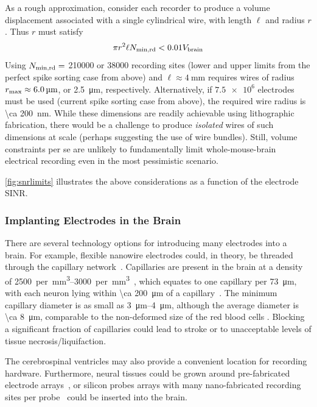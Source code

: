 As a rough approximation, consider each recorder to produce a volume displacement associated with a single cylindrical wire, with length $\ell$ and radius $r$.
Thus $r$ must satisfy \[\pi r^2\ell N_{\text{\scriptsize min,rd}} < 0.01V_{\text{\scriptsize brain}}\]
Using $N_{\text{\scriptsize min,rd}} =$ \num{210000} or \num{38000} recording sites (lower and upper limits from the perfect spike sorting case from above) and $\ell\approx\SI{4}{\milli\meter}$ requires wires of radius $r_{\text{\scriptsize max}} \approx \SI{6.0}{\micro\meter}$, or \SI{2.5}{\micro\meter}, respectively. 
Alternatively, if $\num{7.5e6}$ electrodes must be used (current spike sorting case from above), the required wire radius is \SI{\ca 200}{\nano\meter}.
While these dimensions are readily achievable using lithographic fabrication, there would be a challenge to produce \emph{isolated} wires of such dimensions at scale (perhaps suggesting the use of wire bundles).
Still, volume constraints per se are unlikely to fundamentally limit whole-mouse-brain electrical recording even in the most pessimistic scenario.

\autoref{fig:snrlimits} illustrates the above considerations as a function of the electrode SINR.

\subsubsection{Implanting Electrodes in the Brain}

There are several technology options for introducing many electrodes into a brain.
For example, flexible nanowire electrodes could, in theory, be threaded through the capillary network~\cite{llinas05}.
Capillaries are present in the brain at a density of \SIrange{2500}{3000}{per \milli\meter\cubed}~\cite{schmidt89}, which equates to one capillary per \SI{73}{\micro\meter}, with each neuron lying within \SI{\ca 200}{\micro\meter} of a capillary~\cite{loffredo08}. The minimum capillary diameter is as small as \SIrange{3}{4}{\micro\meter}, although the average diameter is \SI{\ca 8}{\micro\meter}, comparable to the non-deformed size of the red blood cells \cite{Freitas1999}. Blocking a significant fraction of capillaries could lead to stroke or to unacceptable levels of tissue necrosis/liquifaction.

The cerebrospinal ventricles may also provide a convenient location for recording hardware. Furthermore, neural tissues could be grown around pre-fabricated electrode arrays~\cite{jadhav12}, or silicon probes arrays with many nano-fabricated recording sites per probe~\cite{du11} could be inserted into the brain.

